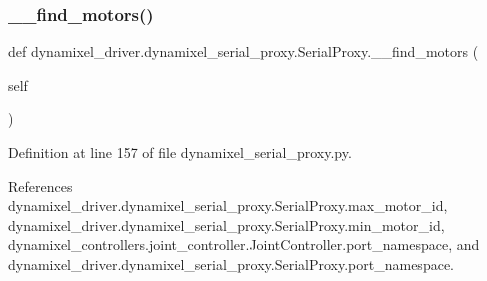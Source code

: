 \subsubsection{\texorpdfstring{\+\_\+\+\_\+find\+\_\+motors()}{\_\_find\_motors()}}
{\footnotesize\ttfamily def dynamixel\+\_\+driver.\+dynamixel\+\_\+serial\+\_\+proxy.\+Serial\+Proxy.\+\_\+\+\_\+find\+\_\+motors (\begin{DoxyParamCaption}\item[{}]{self }\end{DoxyParamCaption})\hspace{0.3cm}{\ttfamily [private]}}



Definition at line 157 of file dynamixel\+\_\+serial\+\_\+proxy.\+py.



References dynamixel\+\_\+driver.\+dynamixel\+\_\+serial\+\_\+proxy.\+Serial\+Proxy.\+max\+\_\+motor\+\_\+id, dynamixel\+\_\+driver.\+dynamixel\+\_\+serial\+\_\+proxy.\+Serial\+Proxy.\+min\+\_\+motor\+\_\+id, dynamixel\+\_\+controllers.\+joint\+\_\+controller.\+Joint\+Controller.\+port\+\_\+namespace, and dynamixel\+\_\+driver.\+dynamixel\+\_\+serial\+\_\+proxy.\+Serial\+Proxy.\+port\+\_\+namespace.


